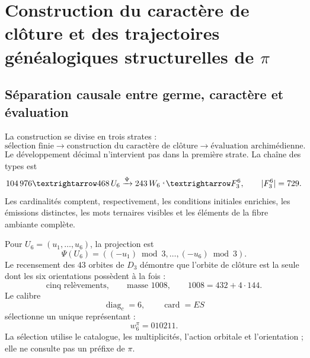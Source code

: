 \label{chap:83-09}


\iffalse

\section{Construction du caractère de clôture et des trajectoires généalogiques structurelles de \(\pi\)}
\label{p12-83-c9-s1:chap:biografia-pi-autonoma}

\subsection{Séparation causale entre germe, caractère et évaluation}

La construction se divise en trois strates :
\[
 \text{sélection finie}
 \longrightarrow
 \text{construction du caractère de clôture}
 \longrightarrow
 \text{évaluation archimédienne}.
\]
Le développement décimal n’intervient pas dans la première strate. La chaîne des types
est
\begin{equation}
 104\,976
 \longrightarrow468\,\mathcal U_6
 \xrightarrow{\Psi}243\,\mathcal W_6
 \lhook\joinrel\longrightarrow\mathbb F_3^6,
 \qquad|\mathbb F_3^6|=729.
 \label{p12-83-c9-s1:eq:cadena-tipica-pi-autonoma}
\end{equation}
Les cardinalités comptent, respectivement, les conditions initiales
enrichies, les émissions distinctes, les mots ternaires visibles et les éléments
de la fibre ambiante complète.

Pour \(U_6=(u_1,\ldots,u_6)\), la projection est
\[
 \Psi(U_6)=((-u_1)\bmod3,\ldots,(-u_6)\bmod3).
\]
Le recensement des \(43\) orbites de \(D_3\) démontre que l’orbite de
clôture est la seule dont les six orientations possèdent à la fois :
\[
 \text{cinq relèvements},\qquad
 \text{masse }1008,\qquad
 1008=432+4\cdot144.
\]
Le calibre
\[
 \operatorname{diag}_c=6,
 \qquad
 \operatorname{card}=ES
\]
sélectionne un unique représentant :
\begin{equation}
 \boxed{w_6^\pi=010211.}
 \label{p12-83-c9-s1:eq:semilla-pi-autonoma}
\end{equation}
La sélection utilise le catalogue, les multiplicités, l’action orbitale et l’orientation ;
elle ne consulte pas un préfixe de \(\pi\).

